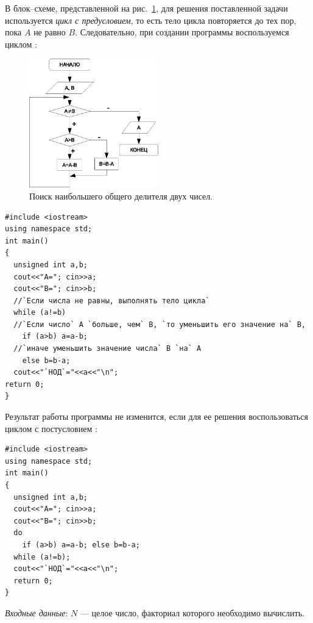 В блок–схеме, представленной на рис.~\ref{ch03:refDrawing27}, для решения поставленной задачи используется
\emph{цикл с предусловием}, то есть тело цикла повторяется до тех пор, пока $A$ не равно
$B$. Следовательно, при создании программы воспользуемся циклом :

\begin{figure}[htb]
\begin{center}
\includegraphics[width=0.5\textwidth]{img/ris_3_28}
\caption{Поиск наибольшего общего делителя двух чисел.}
\label{ch03:refDrawing27}
\end{center}
\end{figure}

\begin{lstlisting}
#include <iostream>
using namespace std;
int main()
{
  unsigned int a,b;
  cout<<"A="; cin>>a;
  cout<<"B="; cin>>b;
  //`Если числа не равны, выполнять тело цикла`
  while (a!=b)
  //`Если число` A `больше, чем` B, `то уменьшить его значение на` B,
    if (a>b) a=a-b;
  //`иначе уменьшить значение числа` B `на` A
    else b=b-a;
  cout<<"`НОД`="<<a<<"\n";
return 0;
}
\end{lstlisting}

Результат работы программы не изменится, если для ее решения воспользоваться циклом с постусловием
:

\begin{lstlisting}
#include <iostream>
using namespace std;
int main()
{
  unsigned int a,b;
  cout<<"A="; cin>>a;
  cout<<"B="; cin>>b;
  do
    if (a>b) a=a-b; else b=b-a;
  while (a!=b);
  cout<<"`НОД`="<<a<<"\n";
  return 0;
}
\end{lstlisting}


\emph{Входные данные}: $N$ --- целое число, факториал которого необходимо вычислить.

